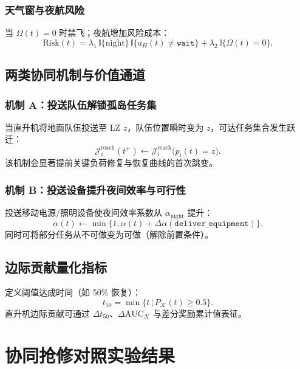 \documentclass[UTF8,zihao=-4,a4paper,fontset=fandol]{ctexrep}
\begin{document}
\subsection{天气窗与夜航风险}
当 $\Omega(t)=0$ 时禁飞；夜航增加风险成本：
\begin{equation}
  \text{Risk}(t) = \lambda_1\,\mathbb{I}\{\text{night}\}\,\mathbb{I}\{a_H(t)\ne\texttt{wait}\}+\lambda_2\,\mathbb{I}\{\Omega(t)=0\}.
\end{equation}

\section{两类协同机制与价值通道}
\subsection{机制 A：投送队伍解锁孤岛任务集}
当直升机将地面队伍投送至 LZ $z$，队伍位置瞬时变为 $z$，可达任务集合发生跃迁：
\begin{equation}
  \mathcal{J}^{\text{reach}}_i(t^+)\leftarrow\mathcal{J}^{\text{reach}}_i\big(p_i(t)=z\big).
\end{equation}
该机制会显著提前关键负荷修复与恢复曲线的首次跳变。

\subsection{机制 B：投送设备提升夜间效率与可行性}
投送移动电源/照明设备使夜间效率系数从 $\alpha_{\text{night}}$ 提升：
\begin{equation}
  \alpha(t)\leftarrow \min\{1,\alpha(t)+\Delta\alpha(\texttt{deliver\_equipment})\}.
\end{equation}
同时可将部分任务从不可做变为可做（解除前置条件）。

\section{边际贡献量化指标}
定义阈值达成时间（如 50\% 恢复）：
\begin{equation}
  t_{50}=\min\{t\,|\,P_{\mathcal{K}}(t)\ge 0.5\}.
\end{equation}
直升机边际贡献可通过 $\Delta t_{50}$、$\Delta\text{AUC}_{\mathcal{K}}$ 与差分奖励累计值表征。

\chapter{协同抢修对照实验结果}\label{ch:exp}
\label{ch:exp_v4}
\end{document}
